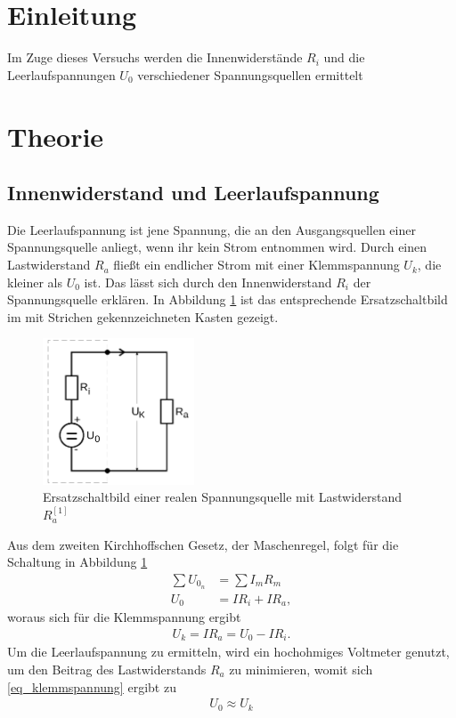 
\section{Einleitung}				%
\setcounter{page}{1}
Im Zuge dieses Versuchs werden die Innenwiderstände $R_i$ und die Leerlaufspannungen $U_0$ verschiedener Spannungsquellen ermittelt
\section{Theorie}
\subsection{Innenwiderstand und Leerlaufspannung}
Die Leerlaufspannung ist jene Spannung, die an den Ausgangsquellen einer Spannungsquelle anliegt, wenn ihr kein Strom entnommen wird. Durch
einen Lastwiderstand $R_a$ fließt ein endlicher Strom mit einer Klemmspannung $U_k$, die kleiner als $U_0$ ist. Das lässt sich durch
den Innenwiderstand $R_i$ der Spannungsquelle erklären. In Abbildung \ref{pic_reell} ist das entsprechende Ersatzschaltbild im mit Strichen 
gekennzeichneten Kasten gezeigt.
\begin{figure}[H]
 \includegraphics[width =0.4\textwidth]{pics/reell.png}
 \caption{Ersatzschaltbild einer realen Spannungsquelle mit Lastwiderstand $R_a ^{[1]}$}
 \label{pic_reell}
\end{figure}
Aus dem zweiten Kirchhoffschen Gesetz, der Maschenregel, folgt für die Schaltung in Abbildung \ref{pic_reell}
\begin{align}
\nonumber
 \sum U_{0_n} &= \sum I_m R_m\\ 
 U_0 &= IR_i + IR_a,
\end{align}
woraus sich für die Klemmspannung ergibt
\begin{align}
 U_k = IR_a = U_0-IR_i.
 \label{eq_klemmspannung}
\end{align}
Um die Leerlaufspannung zu ermitteln, wird ein hochohmiges Voltmeter genutzt, um den Beitrag des Lastwiderstands $R_a$ zu minimieren, 
womit sich \eqref{eq_klemmspannung} ergibt zu
\begin{align}
 U_0 \approx U_k
 \label{eq_U0Uk}
\end{align}

